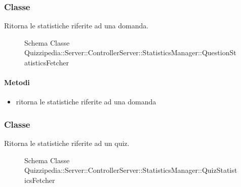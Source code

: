 \subsubsection{Classe }
Ritorna le statistiche riferite ad una domanda.
\begin{figure}[H]
\centering
\noindent{}
\caption[Schema Classe QuestionStatisticsFetcher]{Schema Classe Quizzipedia::Server::ControllerServer::StatisticsManager::QuestionStatisticsFetcher}
\end{figure}
\paragraph{Metodi}
\begin{itemize}
\item {}
\newline
ritorna le statistiche riferite ad una domanda
\newline
\end{itemize}
\subsubsection{Classe }
Ritorna le statistiche riferite ad un quiz.
\begin{figure}[H]
\centering
\noindent{}
\caption[Schema Classe QuizStatisticsFetcher]{Schema Classe Quizzipedia::Server::ControllerServer::StatisticsManager::QuizStatisticsFetcher}
\end{figure}
